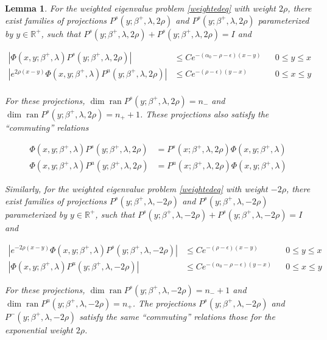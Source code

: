 \documentclass[12pt]{article}
\def\R{{\mathbb R}}
\DeclareMathOperator{\ran}{ran}
\newtheorem{lemma}{Lemma}
\begin{document}
\begin{lemma}\label{weightdichotomy}
For the weighted eigenvalue problem \eqref{weightedeq} with weight $2 \rho$, there exist families of projections $P^s(y; \beta^+, \lambda, 2 \rho)$ and $P^s(y; \beta^+, \lambda, 2 \rho)$ parameterized by $y \in \R^+$, such that $P^s(y; \beta^+, \lambda, 2 \rho) + P^s(y; \beta^+, \lambda, 2 \rho) = I$ and

\begin{align*}
|\Phi(x, y; \beta^+, \lambda)P^s(y; \beta^+, \lambda, 2 \rho)| &\leq C e^{-(\alpha_0 - \rho - \epsilon)(x - y)} && 0 \leq y \leq x \\
|e^{2 \rho (x - y)} \Phi(x, y; \beta^+, \lambda)P^u(y; \beta^+, \lambda, 2 \rho)| &\leq C e^{-(\rho - \epsilon)(y - x)} && 0 \leq x \leq y \\
\end{align*}

For these projections, $\dim \ran P^s(y; \beta^+, \lambda, 2 \rho) = n_-$ and $\dim \ran P^s(y; \beta^+, \lambda, 2 \rho) = n_+ + 1$. These projections also satisfy the ``commuting'' relations 

\begin{align*}
\Phi(x, y; \beta^+, \lambda)P^s(y; \beta^+, \lambda, 2 \rho) 
&= P^s(x; \beta^+, \lambda, 2 \rho) \Phi(x, y; \beta^+, \lambda) \\
\Phi(x, y; \beta^+, \lambda)P^u(y; \beta^+, \lambda, 2 \rho) 
&= P^u(x; \beta^+, \lambda, 2 \rho) \Phi(x, y; \beta^+, \lambda) 
\end{align*}

Similarly, for the weighted eigenvalue problem \eqref{weightedeq} with weight $-2 \rho$, there exist families of projections $P^s(y; \beta^+, \lambda, -2 \rho)$ and $P^s(y; \beta^+, \lambda, -2 \rho)$ parameterized by $y \in \R^+$, such that $P^s(y; \beta^+, \lambda, -2 \rho) + P^s(y; \beta^+, \lambda, -2 \rho) = I$ and

\begin{align*}
|e^{-2 \rho (x - y)}\Phi(x, y; \beta^+, \lambda)P^s(y; \beta^+, \lambda, -2 \rho)| &\leq C e^{-(\rho - \epsilon)(x - y)} && 0 \leq y \leq x \\
|\Phi(x, y; \beta^+, \lambda)P^u(y; \beta^+, \lambda, -2 \rho)| &\leq C e^{-(\alpha_0 - \rho - \epsilon)(y - x)} && 0 \leq x \leq y 
\end{align*}

For these projections, $\dim \ran P^s(y; \beta^+, \lambda, -2 \rho) = n_- + 1$ and $\dim \ran P^u(y; \beta^+, \lambda, -2 \rho) = n_+$. The projections $P^s(y; \beta^+, \lambda, -2 \rho)$ and $P^-(y; \beta^+, \lambda, -2 \rho)$ satisfy the same ``commuting'' relations those for the exponential weight $2 \rho$.\\


\end{lemma}
\end{document}
